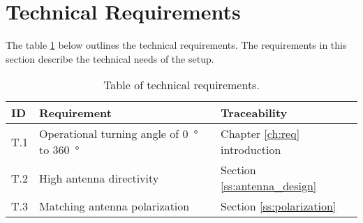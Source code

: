 \section{Technical Requirements}
The table \ref{tab:tech_req} below outlines the technical requirements. The requirements in this section describe the technical needs of the setup.
\begin{table}[H]
    \centering
    \begin{tabular}{p{}|>{\raggedright}p{}|p{}}
        \textbf{ID} & \textbf{Requirement} & \textbf{Traceability} \\
        \hline
        \hline
        T.1 & Operational turning angle of \SI{0}{\degree} to \SI{360}{\degree} & Chapter \ref{ch:req} introduction \\
        T.2 & High antenna directivity & Section \ref{ss:antenna_design} \\
        T.3 & Matching antenna polarization & Section \ref{ss:polarization} \\
    \end{tabular}
    \caption{Table of technical requirements.}
    \label{tab:tech_req}
\end{table}

